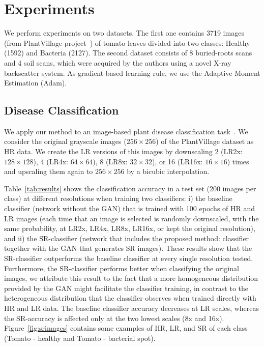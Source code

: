\documentclass[10pt,twocolumn,letterpaper]{article}
\begin{document}
\section{Experiments}
\label{sec:experiments}

We perform experiments on two datasets. The first one contains 3719 images (from PlantVillage project~\cite{Hughes2015}) of tomato leaves divided into two classes: Healthy (1592) and Bacteria (2127). The second dataset consists of 8 buried-roots scans and 4 soil scans, which were acquired by the authors using a novel X-ray backscatter system. As gradient-based learning rule, we use the Adaptive Moment Estimation (Adam).

\subsection{Disease Classification}

We apply our method to an image-based plant disease classification task~\cite{Mohanty2016}. We consider the original grayscale images ($256\times 256$) of the PlantVillage dataset as HR data. We create the LR versions of this images by downscaling 2 (LR2x: $128\times 128$), 4 (LR4x: $64\times 64$), 8 (LR8x: $32\times 32$), or 16 (LR16x: $16\times 16$) times and upscaling them again to $256\times 256$ by a bicubic interpolation.

Table~\ref{tab:results} shows the classification accuracy in a test set (200 images per class) at different resolutions when training two classifiers: i) the baseline classifier (network without the GAN) that is trained with 100 epochs of HR and LR images (each time that an image is selected is randomly downscaled, with the same probability, at LR2x, LR4x, LR8x, LR16x, or kept the original resolution), and ii) the SR-classifier (network that includes the proposed method: classifier together with the GAN that generates SR images). These results show that the SR-classifier outperforms the baseline classifier at every single resolution tested. Furthermore, the SR-classifier performs better when classifying the original images, we attribute this result to the fact that a more homogeneous distribution provided by the GAN might facilitate the classifier training, in contrast to the heterogeneous distribution that the classifier observes when trained directly with HR and LR data. The baseline classifier accuracy decreases at LR scales, whereas the SR-accuracy is affected only at the two lowest scales (8x and 16x). Figure~\ref{fig:srimages} contains some examples of HR, LR, and SR of each class (Tomato - healthy and Tomato - bacterial spot).
\end{document}
